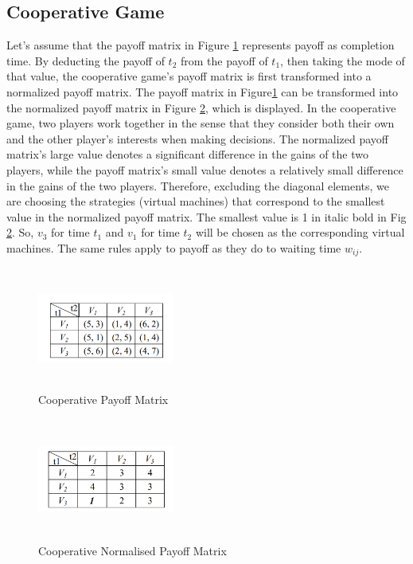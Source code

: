 \documentclass[conference]{IEEEtran}
\begin{document}
\subsection{\textbf{Cooperative Game}}
Let's assume that the payoff matrix in Figure \ref{Fig 6} represents payoff as completion time. By deducting the payoff of $t_{2}$ from the payoff of $t_{1}$, then taking the mode of that value, the cooperative game's payoff matrix is first transformed into a normalized payoff matrix.
The payoff matrix in Figure\ref{Fig 6} can be transformed into the normalized payoff matrix in Figure \ref{Fig 7}, which is displayed.
In the cooperative game, two players work together in the sense that they consider both their own and the other player's interests when making decisions. The normalized payoff matrix's large value denotes a significant difference in the gains of the two players, while the payoff matrix's small value denotes a relatively small difference in the gains of the two players. Therefore, excluding the diagonal elements, we are choosing the strategies (virtual machines) that correspond to the smallest value in the normalized payoff matrix. The smallest value is 1 in italic bold in Fig \ref{Fig 7}. So, $v_{3}$ for time $t_{1}$ and $v_{1}$ for time $t_{2}$ will be chosen as the corresponding virtual machines. The same rules apply to payoff as they do to waiting time $w_{ij}$.
\begin{figure}[h]
  \centering
  \includegraphics[width=0.4\textwidth, height=4cm]{Figures/Fig 5.png}
  \caption{Cooperative Payoff Matrix \cite{patra2019game}}
  \label{Fig 6}
\end{figure}


\begin{figure}[h]
  \centering
  \includegraphics[width=0.4\textwidth, height=4cm]{Figures/Fig 6.png}
  \caption{Cooperative Normalised Payoff Matrix \cite{patra2019game}}
  \label{Fig 7}
\end{figure}
\end{document}

